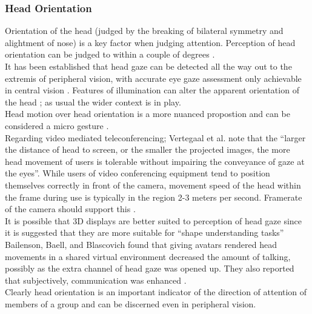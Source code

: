 \subsubsection{Head Orientation}
Orientation of the head (judged by the breaking of bilateral symmetry and alightment of nose) is a key factor when judging attention. Perception of head orientation can be judged to within a couple of degrees \cite{Wilson2000}.\\
It has been established that head gaze can be detected all the way out to the extremis of peripheral vision, with accurate eye gaze assessment only achievable in central vision \cite{Loomis2008}. Features of illumination can alter the apparent orientation of the head \cite{Troje1998}; as usual the wider context is in play.\\
Head motion over head orientation is a more nuanced propostion and can be considered a micro gesture \cite{Boker2011}.\\
Regarding video mediated teleconferencing;  Vertegaal  et al. \cite{Vertegaal00effectsof} note that  the ``larger the distance of head to screen, or the smaller the projected images, the more head movement of users is tolerable without impairing the conveyance of gaze at the eyes''. While users of video conferencing equipment tend to position themselves correctly in front of the camera, movement speed of the head within the frame during use is typically in the region 2-3 meters per second. Framerate of the camera should support this \cite{Bocker1996}.\\
                    It is possible that 3D displays are better suited to perception of head gaze since it is suggested that they are more suitable for ``shape understanding tasks'' \cite{john2001use}\\
                    Bailenson, Baell, and Blascovich found that giving avatars rendered head movements in a shared virtual environment decreased the amount of talking, possibly as the extra channel of head gaze was opened up. They also reported that subjectively, communication was enhanced \cite{Bailenson2002}. \\
                    Clearly head orientation is an important indicator of the direction of attention of members of a group and can be discerned even in peripheral vision. %
